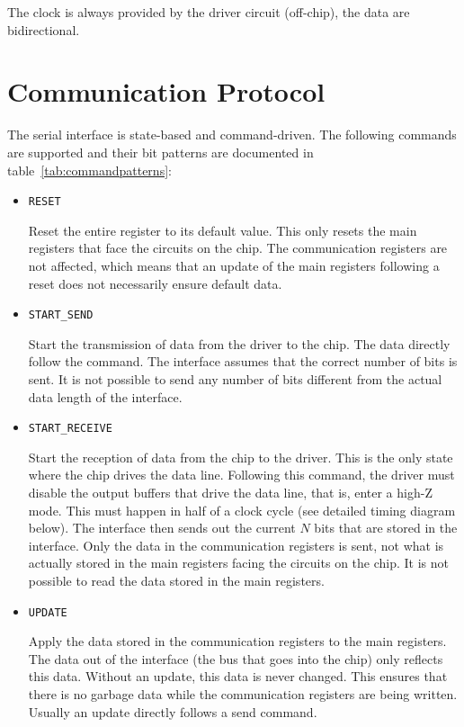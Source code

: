 \documentclass[parskip=half]{scrartcl}
\let\command=\texttt
\begin{document}
    The clock is always provided by the driver circuit (off-chip), the data are bidirectional.
    \section{Communication Protocol}
    The serial interface is state-based and command-driven.
    The following commands are supported and their bit patterns are documented in table~\ref{tab:commandpatterns}:
    \begin{itemize}
        \item \command{RESET}

            Reset the entire register to its default value.
            This only resets the main registers that face the circuits on the chip.
            The communication registers are not affected, which means that an update of the main registers following a reset does not necessarily
            ensure default data.
        \item \command{START\_SEND}

            Start the transmission of data from the driver to the chip.
            The data directly follow the command.
            The interface assumes that the correct number of bits is sent.
            It is not possible to send any number of bits different from the actual data length of the interface.
        \item \command{START\_RECEIVE}

            Start the reception of data from the chip to the driver.
            This is the only state where the chip drives the data line.
            Following this command, the driver must disable the output buffers that drive the data line, that is, enter a high-Z mode.
            This must happen in half of a clock cycle (see detailed timing diagram below).
            The interface then sends out the current $N$ bits that are stored in the interface.
            Only the data in the communication registers is sent, not what is actually stored in the main registers facing the circuits on the
            chip.
            It is not possible to read the data stored in the main registers.
        \item \command{UPDATE}

            Apply the data stored in the communication registers to the main registers.
            The data out of the interface (the bus that goes into the chip) only reflects this data.
            Without an update, this data is never changed.
            This ensures that there is no garbage data while the communication registers are being written.
            Usually an update directly follows a send command.
    \end{itemize}
\end{document}

